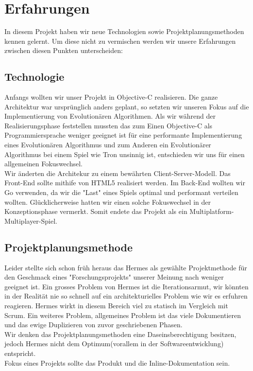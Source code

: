 \section{Erfahrungen}
In diesem Projekt haben wir neue Technologien sowie Projektplanungsmethoden kennen gelernt. Um diese nicht zu vermischen werden wir unsere Erfahrungen zwischen diesen Punkten unterscheiden: 
\subsection{Technologie}
Anfangs wollten wir unser Projekt in Objective-C realisieren. 
Die ganze Architektur war ursprünglich anders geplant, so setzten wir unseren Fokus auf die Implementierung von Evolutionären Algorithmen. 
Als wir während der Realisierungsphase feststellen mussten das zum Einen Objective-C als Programmiersprache weniger geeignet ist 
für eine performante Implementierung eines Evolutionären Algorithmus und zum Anderen ein Evolutionärer Algorithmus bei 
einem Spiel wie Tron unsinnig ist, entschieden wir uns für einen allgemeinen Fokuswechsel.
\\
Wir änderten die Architekur zu einem bewährten Client-Server-Modell. Das Front-End sollte mithife von HTML5 realisiert werden. Im Back-End
wollten wir Go verwenden, da wir die "Last" eines Spiels optimal und performant verteilen wollten. Glücklicherweise hatten wir einen solche Fokuswechsel in
der Konzeptionsphase vermerkt. Somit endete das Projekt als ein Multiplatform-Multiplayer-Spiel.

\subsection{Projektplanungsmethode}
Leider stellte sich schon früh heraus das Hermes als gewählte Projektmethode für den Geschmack eines "Forschungsprojekts" unserer Meinung nach 
weniger geeignet ist. Ein grosses Problem von Hermes ist die Iterationsarmut, wir könnten in der Realität nie so schnell auf ein architekturielles Problem wie wir es
erfuhren reagieren. Hermes wirkt in diesem Bereich viel zu statisch im Vergleich mit Scrum. Ein weiteres Problem, allgemeines Problem ist das viele Dokumentieren und das
ewige Duplizieren von zuvor geschriebenen Phasen.
\\
Wir denken das Projektplanungsmethoden eine Daseinsberechtigung besitzen, jedoch Hermes nicht dem Optimum(vorallem in der Softwareentwicklung) entspricht.
\\
Fokus eines Projekts sollte das Produkt und die Inline-Dokumentation sein. 
